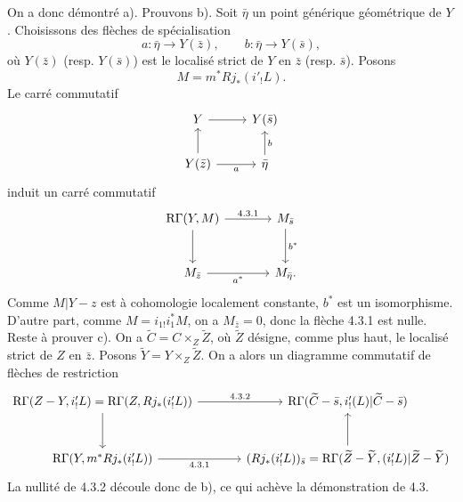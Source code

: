 \documentclass[11pt]{article}
\begin{document}
On a donc démontré a). Prouvons b). Soit $\bar\eta$ un point générique géométrique de $Y$. Choisissons des flèches de spécialisation
\[
a:\bar\eta\to Y(\bar z),\qquad b:\bar\eta\to Y(\bar s),
\]
où $Y(\bar z)$ (resp. $Y(\bar s)$) est le localisé strict de $Y$ en $\bar z$ (resp. $\bar s$). Posons
\[
M=m^*Rj_*(i'_!L).
\]
Le carré commutatif
\[
\begin{tikzcd}
Y \arrow[r] & Y(\bar s)\\
Y(\bar z) \arrow[u] \arrow[r,"a"'] & \bar\eta \arrow[u,"b"']
\end{tikzcd}
\]
induit un carré commutatif
\[
\begin{tikzcd}[column sep=large,row sep=large]
\mathrm R\Gamma(Y,M) \arrow[r,"4.3.1"] \arrow[d] & M_{\bar s} \arrow[d,"b^*"]\\
M_{\bar z} \arrow[r,"a^*"'] & M_{\bar\eta}.
\end{tikzcd}
\]
Comme $M|Y-z$ est à cohomologie localement constante, $b^*$ est un isomorphisme. D'autre part, comme $M=i_{1!}i_1^*M$, on a $M_{\bar z}=0$, donc la flèche 4.3.1 est nulle. Reste à prouver c). On a $\widetilde C=C\times_Z\widetilde Z$, où $\widetilde Z$ désigne, comme plus haut, le localisé strict de $Z$ en $\bar z$. Posons $\widetilde Y=Y\times_Z\widetilde Z$. On a alors un diagramme commutatif de flèches de restriction
\[
\begin{tikzcd}[column sep=large,row sep=large]
\mathrm R\Gamma(Z-Y,i'_!L)=\mathrm R\Gamma(Z,Rj_*(i'_!L))
 \arrow[r,"4.3.2"] \arrow[d]
&
\mathrm R\Gamma(\widetilde C-\bar s,i'_!(L)|\widetilde C-\bar s)\\
\mathrm R\Gamma(Y,m^*Rj_*(i'_!L)) \arrow[r,"4.3.1"']
&
(Rj_*(i'_!L))_{\bar s}
  =\mathrm R\Gamma(\widetilde Z-\widetilde Y,(i'_!L)|\widetilde Z-\widetilde Y) \arrow[u]
\end{tikzcd}
\]
La nullité de 4.3.2 découle donc de b), ce qui achève la démonstration de 4.3.
\end{document}
